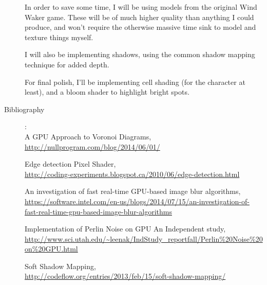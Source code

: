 \documentclass {article}
\begin{document}
\begin{description}
In order to save some time, I will be using models from the original Wind Waker game.  These will be of much higher quality than anything I could produce, and won't require the otherwise massive time sink to model and texture things myself.

I will also be implementing shadows, using the common shadow mapping technique for added depth.

For final polish, I'll be implementing cell shading (for the character at least), and a bloom shader to highlight bright spots.

\item[Bibliography]:\\

A GPU Approach to Voronoi Diagrams,\\
\url{http://nullprogram.com/blog/2014/06/01/}

Edge detection Pixel Shader,\\
\url{http://coding-experiments.blogspot.ca/2010/06/edge-detection.html}

An investigation of fast real-time GPU-based image blur algorithms,\\
\url{https://software.intel.com/en-us/blogs/2014/07/15/an-investigation-of-fast-real-time-gpu-based-image-blur-algorithms}

Implementation of Perlin Noise on GPU An Independent study,\\
\url{http://www.sci.utah.edu/~leenak/IndStudy_reportfall/Perlin%20Noise%20on%20GPU.html}

Soft Shadow Mapping,\\
\url{http://codeflow.org/entries/2013/feb/15/soft-shadow-mapping/}

\end{description}
\newpage


\end{document}
